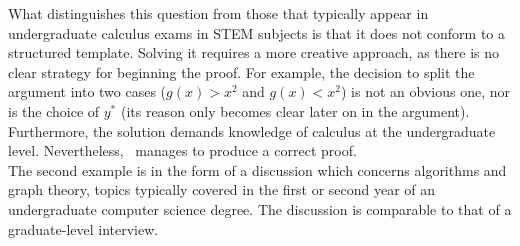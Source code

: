 What distinguishes this question from those that typically appear in undergraduate calculus exams in STEM subjects is that it does not conform to a structured template. Solving it requires a more creative approach, as there is no clear strategy for beginning the proof. For example, the decision to split the argument into two cases ($g(x) > x^2$ and $g(x) < x^2$) is not an obvious one, nor is the choice of $y^*$ (its reason only becomes clear later on in the argument). Furthermore, the solution demands knowledge of calculus at the undergraduate level. Nevertheless, \DV \ manages to produce a correct proof. \\

The second example is in the form of a discussion which concerns algorithms and graph theory, topics typically covered in the first or second year of an undergraduate computer science degree. The discussion is comparable to that of a graduate-level interview.
